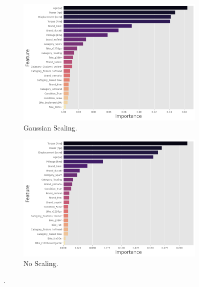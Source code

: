 \begin{figure}
\begin{subfigure}[b]{0.48\textwidth}
        \includegraphics[width=\textwidth]{"content/pics/Feature_Importances_norm.png"}
        \caption{Gaussian Scaling.}
    \end{subfigure}
    \hfill
    \begin{subfigure}[b]{0.48\textwidth}
        \centering
        \includegraphics[width=\textwidth]{"content/pics/Feature_Importances_none.png"}
        \caption{No Scaling.}
    \end{subfigure}
    \caption{.}
    \label{fig:}
\end{figure}

